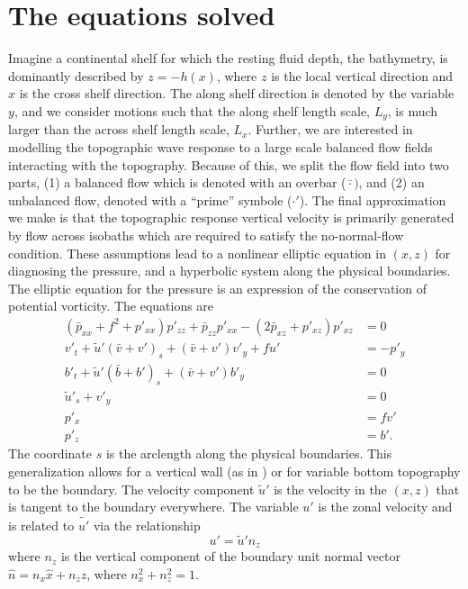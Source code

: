 \documentclass[12pt]{memoir}
\begin{document}
\section{The equations solved}
Imagine a continental shelf for which the resting fluid depth, the bathymetry, is dominantly described by $z = -h(x)$, where $z$ is the local vertical direction and $x$ is the cross shelf direction. The along shelf direction is denoted by the variable $y$, and we consider motions such that the along shelf length scale, $L_y$, is much larger than the across shelf length scale, $L_x$. Further, we are interested in modelling the topographic wave response to a large scale balanced flow fields interacting with the topography. Because of this, we split the flow field into two parts, (1) a balanced flow which is denoted with an overbar ($\bar{\cdot})$, and (2) an unbalanced flow, denoted with a ``prime'' symbole ($\cdot '$). The final approximation we make is that the topographic response vertical velocity is primarily generated by flow across isobaths which are required to satisfy the no-normal-flow condition. These assumptions lead to a nonlinear elliptic equation in $(x,z)$ for diagnosing the pressure, and a hyperbolic system along the physical boundaries. The elliptic equation for the pressure is an expression of the conservation of potential vorticity. The equations are
\begin{subequations}
\begin{align}
(\bar{p}_{xx} + f^2 + p'_{xx})p'_{zz} + \bar{p}_{zz} p'_{xx} - (2\bar{p}_{xz} + p'_{xz})p'_{xz} &= 0 \\
v'_t + \tilde{u}'(\bar{v}+ v')_s + (\bar{v} + v')v'_y + fu' &= -p'_y \\
b'_t + \tilde{u}'(\bar{b} + b')_s + (\bar{v} + v')b'_y &= 0 \\
\tilde{u}'_s + v'_y &= 0 \\
p'_x &= fv' \\
p'_z &= b'.
\end{align}\label{eq:nonlinearEquations}
\end{subequations}
The coordinate $s$ is the arclength along the physical boundaries. This generalization allows for a vertical wall (as in \citet{HoggEtAl2011}) or for variable bottom topography to be the boundary.  The velocity component $\tilde{u}'$ is the velocity in the $(x,z)$ that is tangent to the boundary everywhere. The variable $u'$ is the zonal velocity and is related to $\tilde{u'}$ via the relationship
\begin{equation}
u' =\tilde{u}' n_z
\end{equation}
where $n_z$ is the vertical component of the boundary unit normal vector $\hat{n} = n_x \hat{x} + n_z \hat{z}$, where $n_x^2  + n_z^2 = 1$.
\end{document}
